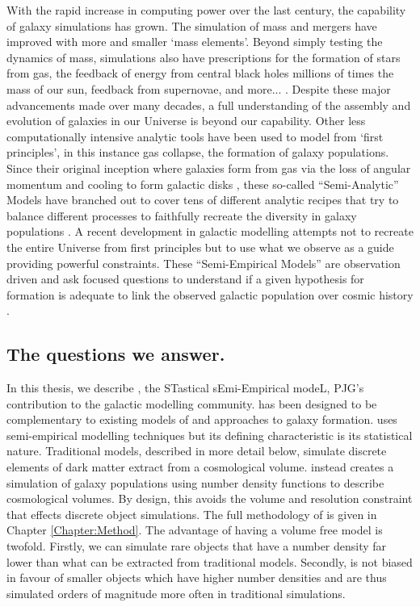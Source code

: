 With the rapid increase in computing power over the last century, the capability of galaxy simulations has grown. The simulation of mass and mergers have improved with more and smaller `mass elements'. Beyond simply testing the dynamics of mass, simulations also have prescriptions for the formation of stars from gas, the feedback of energy from central black holes millions of times the mass of our sun, feedback from supernovae, and more... \citep[e.g.,][]{McAlpine2015TheCatalogues, Pillepich2018FirstGalaxies}. Despite these major advancements made over many decades, a full understanding of the assembly and evolution of galaxies in our Universe is beyond our capability. Other less computationally intensive analytic tools have been used to model from `first principles', in this instance gas collapse, the formation of galaxy populations. Since their original inception where galaxies form from gas via the loss of angular momentum and cooling to form galactic disks \cite{Mo1998TheDiscs}, these so-called ``Semi-Analytic'' Models have branched out to cover tens of different analytic recipes that try to balance different processes to faithfully recreate the diversity in galaxy populations \citep[e.g.,][]{DeLucia2006TheGalaxies, Guo2011FromCosmology}. A recent development in galactic modelling attempts not to recreate the entire Universe from first principles but to use what we observe as a guide providing powerful constraints. These ``Semi-Empirical Models'' are observation driven and ask focused questions to understand if a given hypothesis for formation is adequate to link the observed galactic population over cosmic history \citep{Hopkins2010MERGERSMATTER, Zavala2012, Moster2013, Shankar2014, Moster2018Emerge10}.

\subsection{The questions we answer.}
In this thesis, we describe \steel, the STastical sEmi-Empirical modeL, PJG's contribution to the galactic modelling community. \steel has been designed to be complementary to existing models of and approaches to galaxy formation. \steel uses semi-empirical modelling techniques but its defining characteristic is its statistical nature. Traditional models, described in more detail below, simulate discrete elements of dark matter extract from a cosmological volume. \steel instead creates a simulation of galaxy populations using number density functions to describe cosmological volumes. By design, this avoids the volume and resolution constraint that effects discrete object simulations. The full methodology of \steel is given in Chapter \ref{Chapter:Method}. The advantage of having a volume free model is twofold. Firstly, we can simulate rare objects that have a number density far lower than what can be extracted from traditional models. Secondly, \steel is not biased in favour of smaller objects which have higher number densities and are thus simulated orders of magnitude more often in traditional simulations.

